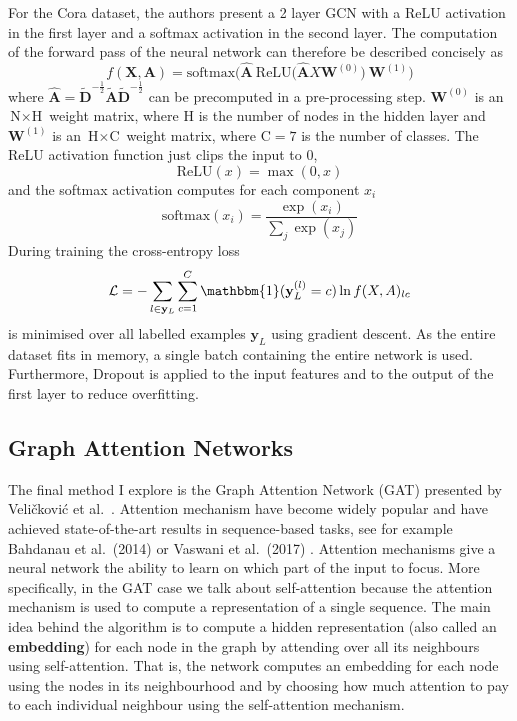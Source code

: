 \documentclass[12pt]{article}
\theoremstyle{definition}
\begin{document}
\bigskip

For the Cora dataset, the authors present a 2 layer GCN with a ReLU activation in the first layer and a softmax activation in the second layer. The computation of the forward pass of the neural network can therefore be described concisely as
\[
f(\mathbf{X},\mathbf{A}) = \textrm{softmax}\big(\hat{\mathbf{A}}\ \textrm{ReLU}\big( \hat{\mathbf{A}} X \mathbf{W}^{(0)} \big)\ \mathbf{W}^{(1)} \big)
\]
where $\hat{\mathbf{A}} = \tilde{\mathbf{D}}^{-\frac{1}{2}} \tilde{\mathbf{A}} \tilde{\mathbf{D}}^{-\frac{1}{2}}$ can be precomputed in a pre-processing step. $\mathbf{W}^{(0)}$ is an $\textrm{N} \times \textrm{H}$ weight matrix, where $\textrm{H}$ is the number of nodes in the hidden layer and $\mathbf{W}^{(1)}$ is an $\textrm{H} \times \textrm{C}$ weight matrix, where $\textrm{C} = 7$ is the number of classes. The ReLU activation function just clips the input to 0,
\[
\textrm{ReLU}(x) = \max(0, x)
\]
and the softmax activation computes for each component $x_i$
\[
\textrm{softmax}(x_i) = \frac{\exp(x_i)}{\sum_j \exp(x_j)}
\]
During training the cross-entropy loss 
\[
\mathcal{L} = - \sum_{l \in \mathbf{y}_L} \sum_{c=1}^{C} \mathbbm{1}(
\textbf{y}_{L}^{(l)} = c) \ln f(X,A)_{lc}
\]
is minimised over all labelled examples $\textbf{y}_L$ using gradient descent. As the entire dataset fits in memory, a single batch containing the entire network is used. Furthermore, Dropout \cite{srivastava2014dropout} is applied to the input features and to the output of the first layer to reduce overfitting.

\subsection{Graph Attention Networks}
The final method I explore is the Graph Attention Network (GAT) presented by Veli{\v{c}}kovi{\'{c}} et al.\ \cite{velickovic2018graph}. Attention mechanism have become widely popular and have achieved state-of-the-art results in sequence-based tasks, see for example Bahdanau et al.\ (2014) \cite{bahdanau2014neural} or Vaswani et al.\ (2017) \cite{vaswani2017attention}. Attention mechanisms give a neural network the ability to learn on which part of the input to focus. More specifically, in the GAT case we talk about self-attention because the attention mechanism is used to compute a representation of a single sequence. The main idea behind the algorithm is to compute a hidden representation (also called an \textbf{embedding}) for each node in the graph by attending over all its neighbours using self-attention. That is, the network computes an embedding for each node using the nodes in its neighbourhood and by choosing how much attention to pay to each individual neighbour using the self-attention mechanism.
\end{document}
